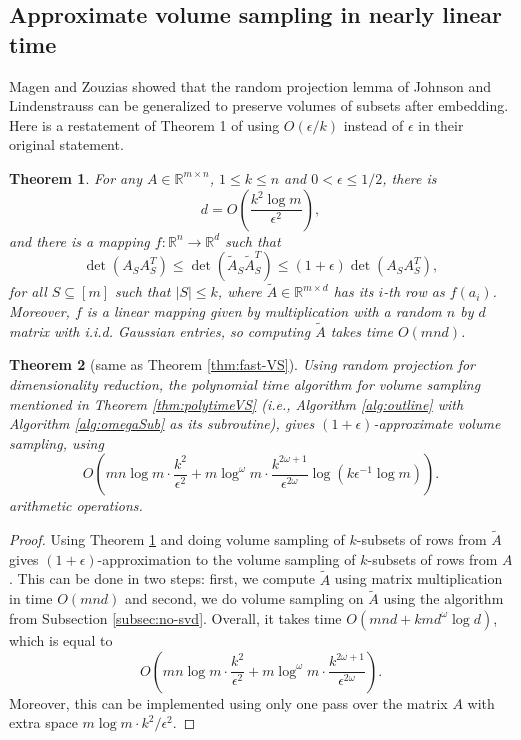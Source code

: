 \documentclass[11pt]{article}
\newcommand{\card}[1]{\lvert{#1}\rvert}
\newtheorem{theorem}{Theorem}
\def\reals{\mathbb{R}}
\def\eps{\epsilon}
\newcommand{\deter}[1]{\operatorname{det}\left(#1\right)}
\begin{document}
\subsection{Approximate volume sampling in nearly linear time}\label{subsec:random-proj}
Magen and Zouzias \cite{MZ} showed that the random projection lemma of Johnson and Lindenstrauss can be generalized to preserve volumes of subsets after embedding. Here is a restatement of Theorem 1 of \cite{MZ} using $O(\eps/k)$ instead of $\epsilon$ in their original statement.
\begin{theorem} \label{thm:random-projection} \cite{MZ}
For any $A \in \reals^{m \times n}$, $1\leq k \leq n$ and $0 < \eps \leq 1/2$, there is
\[
d = O\left(\frac{k^{2} \log m}{\eps^{2}}\right),
\]
and there is a mapping $f: \reals^{n} \rightarrow \reals^{d}$ such that
\[
\deter{A_{S} A_{S}^{T}} \leq \deter{\tilde{A}_{S} \tilde{A}_{S}^{T}} \leq (1+\eps) \deter{A_{S} A_{S}^{T}},
\]
for all $S \subseteq [m]$ such that $\card{S} \leq k$, where $\tilde{A} \in \reals^{m \times d}$ has its $i$-th row as $f(a_{i})$. Moreover, $f$ is a linear mapping given by multiplication with a random $n$ by $d$ matrix with i.i.d. Gaussian entries, so computing $\tilde{A}$ takes time $O(mnd)$.
\end{theorem}

\begin{theorem}[same as Theorem \ref{thm:fast-VS}]
Using random projection for dimensionality reduction, the polynomial time algorithm for volume sampling mentioned in Theorem \ref{thm:polytimeVS} (i.e., Algorithm \ref{alg:outline} with Algorithm \ref{alg:omegaSub} as its subroutine), gives $(1+\eps)$-approximate volume sampling, using
\[
O\left(mn \log m \cdot \frac{k^{2}}{\eps^{2}} + m \log^{\omega} m \cdot \frac{k^{2\omega + 1}}{\eps^{2\omega}} \log(k \eps^{-1} \log m) \right).
\]
arithmetic operations.
\end{theorem}
\begin{proof}
Using Theorem \ref{thm:random-projection} and doing volume sampling of $k$-subsets of rows from $\tilde{A}$ gives $(1+\eps)$-approximation to the volume sampling of $k$-subsets of rows from $A$. This can be done in two steps: first, we compute $\tilde{A}$ using matrix multiplication in time $O(mnd)$ and second, we do volume sampling on $\tilde{A}$ using the algorithm from Subsection \ref{subsec:no-svd}. Overall, it takes time $O(mnd + kmd^{\omega} \log d)$, which is equal to
\[
O\left(mn \log m \cdot \frac{k^{2}}{\eps^{2}} + m \log^{\omega} m \cdot \frac{k^{2\omega + 1}}{\eps^{2\omega}}\right).
\]
Moreover, this can be implemented using only one pass over the matrix $A$ with extra space $m \log m \cdot k^{2}/\eps^{2}$.
\end{proof}
\end{document}
